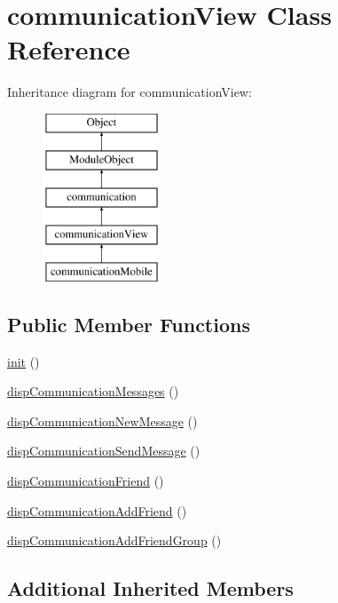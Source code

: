 \hypertarget{classcommunicationView}{\section{communication\-View Class Reference}
\label{classcommunicationView}
}
Inheritance diagram for communication\-View\-:\begin{figure}[H]
\begin{center}
\leavevmode
\includegraphics[height=5.000000cm]{classcommunicationView}
\end{center}
\end{figure}
\subsection*{Public Member Functions}
\begin{DoxyCompactItemize}
\item 
\hyperlink{classcommunicationView_abf9303274b2b073771fa7564247b160c}{init} ()
\item 
\hyperlink{classcommunicationView_af3af3334ae9f2e3a7809fe5b4957bc2b}{disp\-Communication\-Messages} ()
\item 
\hyperlink{classcommunicationView_a3f0afc676b2ea9ee123f86fc362aeb19}{disp\-Communication\-New\-Message} ()
\item 
\hyperlink{classcommunicationView_a7c9525d8c0851708e5b768df15e61bf6}{disp\-Communication\-Send\-Message} ()
\item 
\hyperlink{classcommunicationView_a676e4e4ab5900c536557befbbde6a88a}{disp\-Communication\-Friend} ()
\item 
\hyperlink{classcommunicationView_a481636c7776213713b950a827aa6f728}{disp\-Communication\-Add\-Friend} ()
\item 
\hyperlink{classcommunicationView_a6675ce671029732a7d5d6428287ddd4b}{disp\-Communication\-Add\-Friend\-Group} ()
\end{DoxyCompactItemize}
\subsection*{Additional Inherited Members}


